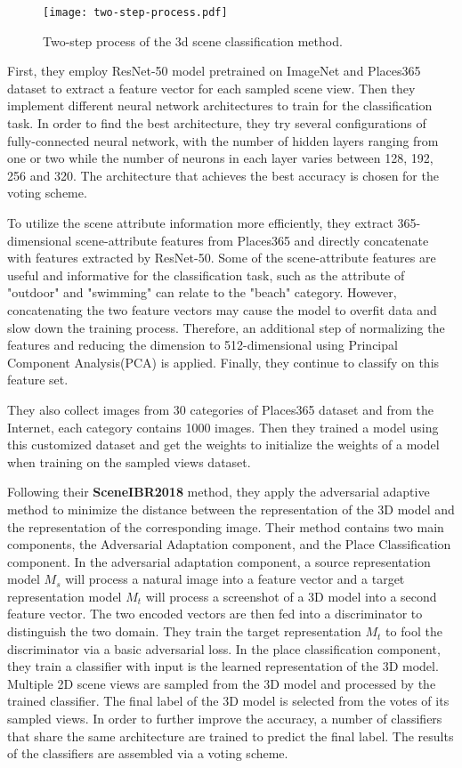 \documentclass[../main.tex]{subfiles}
\begin{document}
	\begin{figure}
		\centering
		\texttt{[image: two-step-process.pdf]}
		\caption{Two-step process of the 3d scene classification method.}
		\label{fig:3D overview}
	\end{figure}
	
	First, they employ ResNet-50\cite{resnet} model pretrained on ImageNet\cite{ImageNet} and Places365\cite{zhou2017places} dataset to extract a feature vector for each sampled scene view. Then they implement different neural network architectures to train for the classification task. In order to find the best architecture, they try several configurations of fully-connected neural network, with the number of hidden layers ranging from one or two while the number of neurons in each layer varies between 128, 192, 256 and 320. The architecture that achieves the best accuracy is chosen for the voting scheme.
	
	To utilize the scene attribute information more efficiently, they extract 365-dimensional scene-attribute features from Places365 and directly concatenate with features extracted by ResNet-50. Some of the scene-attribute features are useful and informative for the classification task, such as the attribute of "outdoor" and "swimming" can relate to the "beach" category. However, concatenating the two feature vectors may cause the model to overfit data and slow down the training process. Therefore, an additional step of normalizing the features and reducing the dimension to 512-dimensional using Principal Component Analysis(PCA) is applied. Finally, they continue to classify on this feature set.
	
	They also collect images from 30 categories of Places365 dataset and from the Internet, each category contains 1000 images. Then they trained a model using this customized dataset and get the weights to initialize the weights of a model when training on the sampled views dataset.
	
	
	Following their \textbf{SceneIBR2018} method, they apply the adversarial adaptive method to minimize the distance between the representation of the 3D model and the representation of the corresponding image. Their method contains two main components, the Adversarial Adaptation component, and the Place Classification component. In the adversarial adaptation component, a source representation model $M_s$ will process a natural image into a feature vector and a target representation model $M_t$ will process a screenshot of a 3D model into a second feature vector. The two encoded vectors are then fed into a discriminator to distinguish the two domain. They train the target representation $M_t$ to fool the discriminator via a basic adversarial loss. In the place classification component, they train a classifier with input is the learned representation of the 3D model. Multiple 2D scene views are sampled from the 3D model and processed by the trained classifier. The final label of the 3D model is selected from the votes of its sampled views. In order to further improve the accuracy, a number of classifiers that share the same architecture are trained to predict the final label. The results of the classifiers are assembled via a voting scheme.
	
\end{document}
